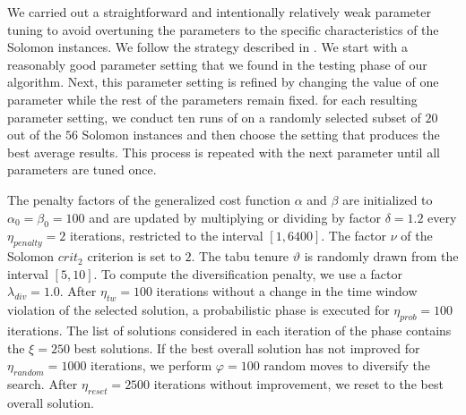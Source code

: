 \documentclass[11pt,a4paper,fleqn]{article}
\begin{document}
We carried out a straightforward and intentionally relatively weak parameter tuning to avoid overtuning the parameters to the specific characteristics of the Solomon instances. We follow the strategy described in \citet{ropke:06}. We start with a reasonably good parameter setting that we found in the testing phase of our algorithm. Next, this parameter setting is refined by changing the value of one parameter while the rest of the parameters remain fixed.  for each resulting parameter setting, we conduct ten runs of \tsnew on a randomly selected subset of $20$ out of the $56$ Solomon instances and then choose the setting that produces the best average results. This process is repeated with the next parameter until all parameters are tuned once. 

The penalty factors of the generalized cost function $\alpha$ and $\beta$ are initialized to $\alpha_0=\beta_0=100$ and are updated by multiplying or dividing by factor $\delta=1.2$ every $\eta_{\mathit{penalty}} = 2$ iterations, restricted to the interval $[1,6400]$. The factor $\nu$ of the Solomon $\mathit{crit}_2$ criterion is set to $2$. The tabu tenure  $\vartheta$ is randomly drawn from the interval  $[5,10]$. To compute the diversification penalty, we use a factor $\lambda_{\mathit{div}} = 1.0$. After $\eta_{\mathit{tw}} = 100$ iterations without a change in the time window violation of the selected solution, a probabilistic phase is executed for $\eta_{\mathit{prob}} = 100$ iterations. The list of solutions considered in each iteration of the phase contains the  $\xi = 250$ best solutions. If the best overall solution has not improved for $\eta_{\mathit{random}}=1000$ iterations, we perform  $\varphi=100$ random moves to diversify the search. After $\eta_{\mathit{reset}}=2500$ iterations without improvement, we reset to the best overall solution. 

  
\end{document}
